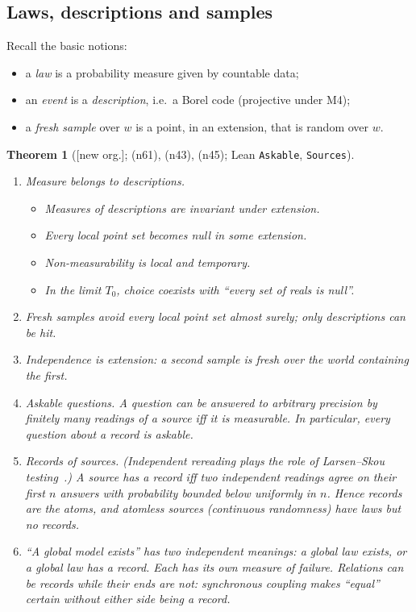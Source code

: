 \documentclass[11pt]{article}
\newtheorem{theorem}{Theorem}[section]
\theoremstyle{definition}
\theoremstyle{remark}
\newcommand{\lean}[1]{\texttt{#1}}
\newcommand{\status}[1]{\textsf{[#1]}}
\newcommand{\note}[1]{\textsf{(n#1)}}
\begin{document}
\subsection{Laws, descriptions and samples}

Recall the basic notions:
\begin{itemize}
\item a \emph{law} is a probability measure given by countable data;
\item an \emph{event} is a \emph{description}, i.e.\ a Borel code (projective under M4);
\item a \emph{fresh sample} over $w$ is a point, in an extension, that is random over $w$.
\end{itemize}

\begin{theorem}[\status{new org.}; \note{61}, \note{43}, \note{45}; Lean \lean{Askable}, \lean{Sources}]\label{thm:prob1}
\leavevmode
\begin{enumerate}
\item \emph{Measure belongs to descriptions.}
  \begin{itemize}
  \item Measures of descriptions are invariant under extension.
  \item Every local point set becomes null in some extension.
  \item Non-measurability is local and temporary.
  \item In the limit $T_0$, choice coexists with ``every set of reals is null''.
  \end{itemize}
\item \emph{Fresh samples} avoid every local point set almost surely; only descriptions can be hit.
\item \emph{Independence is extension}: a second sample is fresh over the world containing the first.
\item \emph{Askable questions.} A question can be answered to arbitrary precision by finitely many readings of a source iff it is measurable. In particular, every question about a record is askable.
\item \emph{Records of sources.} (Independent rereading plays the role of Larsen--Skou testing~\cite{LarsenSkou91}.) A source has a record iff two independent readings agree on their first $n$ answers with probability bounded below uniformly in $n$. Hence records are the atoms, and atomless sources (continuous randomness) have laws but no records.
\item ``A global model exists'' has two independent meanings: a global \emph{law} exists, or a global law \emph{has a record}. Each has its own measure of failure. Relations can be records while their ends are not: synchronous coupling makes ``equal'' certain without either side being a record.
\end{enumerate}
\end{theorem}
\end{document}

